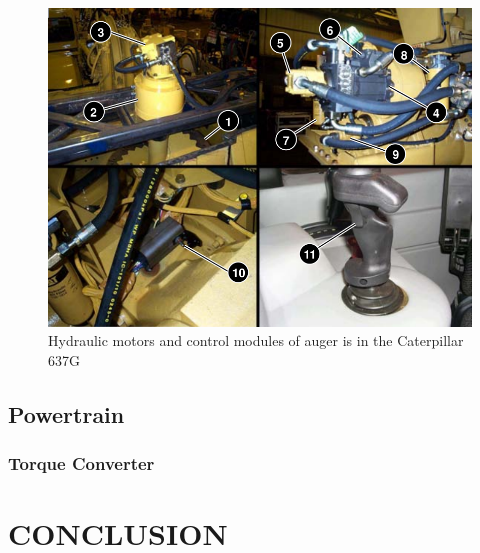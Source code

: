 \documentclass[a4paper,man,natbib]{apa6}
\begin{document}
\begin{figure}[!ht]
\centering
\includegraphics[width=\textwidth]{auger_comps.png}
\centering\caption{\label{fig:grcom}Hydraulic motors and control modules of auger is in the Caterpillar 637G \citep{hvyqpmtrg}}
\end{figure}
\FloatBarrier{}

\subsection{Powertrain}

\subsubsection{Torque Converter}

\section{CONCLUSION}




\end{document}
